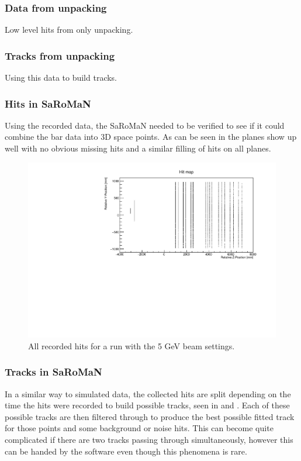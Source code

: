 \subsubsection{Data from unpacking}
Low level hits from only unpacking.

\subsubsection{Tracks from unpacking}
Using this data to build tracks.
\fi

\subsubsection{Hits in SaRoMaN}
Using the recorded data, the SaRoMaN needed to be verified to see if it could combine the bar data into 3D space points. As can be seen in  the planes show up well with no obvious missing hits and a similar filling of hits on all planes.

\begin{figure}[h!]
\centering
\includegraphics[width=\textwidth]{figures/HitMap5GeVYZ.pdf}
\caption{All recorded hits for a run with the 5 GeV beam settings.}
\label{fig:hitmap}
\end{figure}


\subsubsection{Tracks in SaRoMaN}
In a similar way to simulated data, the collected hits are split depending on the time the hits were recorded to build possible tracks, seen in  and . Each of these possible tracks are then filtered through to produce the best possible fitted track for those points and some background or noise hits. This can become quite complicated if there are two tracks passing through simultaneously, however this can be handed by the software even though this phenomena is rare.

